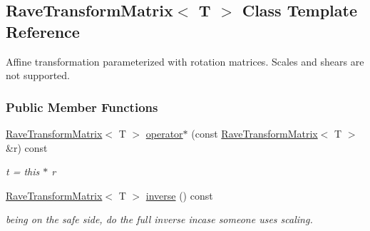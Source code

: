 \hypertarget{classOpenRAVE_1_1geometry_1_1RaveTransformMatrix}{
\subsection{RaveTransformMatrix$<$ T $>$ Class Template Reference}
\label{classOpenRAVE_1_1geometry_1_1RaveTransformMatrix}
}


Affine transformation parameterized with rotation matrices. Scales and shears are not supported.  


\subsubsection*{Public Member Functions}
\begin{DoxyCompactItemize}
\item 
\hypertarget{classOpenRAVE_1_1geometry_1_1RaveTransformMatrix_adeb4f0cf3457e5c58aa980091e9c83c5}{
\hyperlink{classOpenRAVE_1_1geometry_1_1RaveTransformMatrix}{RaveTransformMatrix}$<$ T $>$ \hyperlink{classOpenRAVE_1_1geometry_1_1RaveTransformMatrix_adeb4f0cf3457e5c58aa980091e9c83c5}{operator$\ast$} (const \hyperlink{classOpenRAVE_1_1geometry_1_1RaveTransformMatrix}{RaveTransformMatrix}$<$ T $>$ \&r) const }
\label{classOpenRAVE_1_1geometry_1_1RaveTransformMatrix_adeb4f0cf3457e5c58aa980091e9c83c5}

\begin{DoxyCompactList}\small\item\em t = this $\ast$ r \item\end{DoxyCompactList}\item 
\hypertarget{classOpenRAVE_1_1geometry_1_1RaveTransformMatrix_a5452318a7e4027a0907e7492ce8389f6}{
\hyperlink{classOpenRAVE_1_1geometry_1_1RaveTransformMatrix}{RaveTransformMatrix}$<$ T $>$ \hyperlink{classOpenRAVE_1_1geometry_1_1RaveTransformMatrix_a5452318a7e4027a0907e7492ce8389f6}{inverse} () const }
\label{classOpenRAVE_1_1geometry_1_1RaveTransformMatrix_a5452318a7e4027a0907e7492ce8389f6}

\begin{DoxyCompactList}\small\item\em being on the safe side, do the full inverse incase someone uses scaling. \item\end{DoxyCompactList}\end{DoxyCompactItemize}
